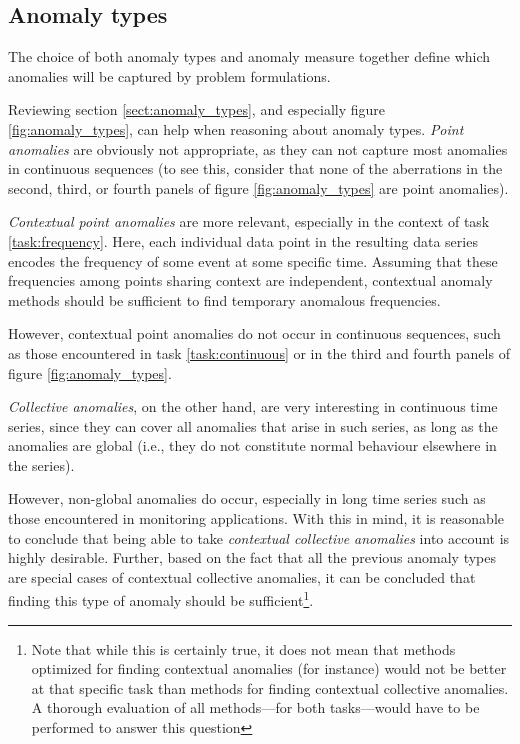 \subsection{Anomaly types}

The choice of both anomaly types and anomaly measure together define which anomalies will be captured by problem formulations.

Reviewing section \ref{sect:anomaly_types}, and especially figure \ref{fig:anomaly_types}, can help when reasoning about anomaly types. \emph{Point anomalies} are obviously not appropriate, as they can not capture most anomalies in continuous sequences (to see this, consider that none of the aberrations in the second, third, or fourth panels of figure \ref{fig:anomaly_types} are point anomalies).

\emph{Contextual point anomalies} are more relevant, especially in the context of task \ref{task:frequency}. Here, each individual data point in the resulting data series encodes the frequency of some event at some specific time. Assuming that these frequencies among points sharing context are independent, contextual anomaly methods should be sufficient to find temporary anomalous frequencies.

However, contextual point anomalies do not occur in continuous sequences, such as those encountered in task \ref{task:continuous} or in the third and fourth panels of figure \ref{fig:anomaly_types}.

\emph{Collective anomalies}, on the other hand, are very interesting in continuous time series, since they can cover all anomalies that arise in such series, as long as the anomalies are global (i.e., they do not constitute normal behaviour elsewhere in the series).

However, non-global anomalies do occur, especially in long time series such as those encountered in monitoring applications. With this in mind, it is reasonable to conclude that being able to take \emph{contextual collective anomalies} into account is highly desirable. Further, based on the fact that all the previous anomaly types are special cases of contextual collective anomalies, it can be concluded that finding this type of anomaly should be sufficient\footnote{Note that while this is certainly true, it does not mean that methods optimized for finding contextual anomalies (for instance) would not be better at that specific task than methods for finding contextual collective anomalies. A thorough evaluation of all methods---for both tasks---would have to be performed to answer this question}.

